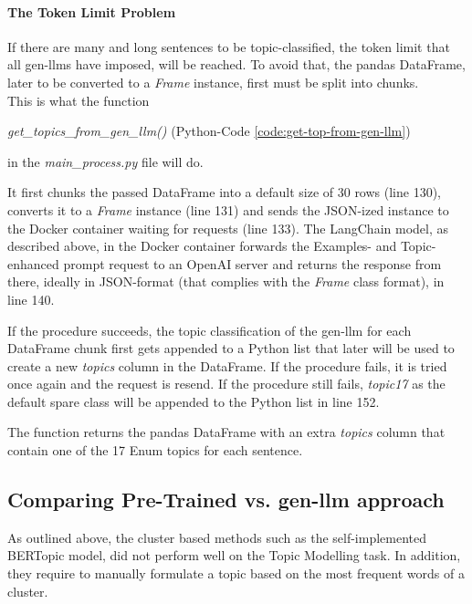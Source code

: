 \paragraph{The Token Limit Problem}
If there are many and long sentences to be topic-classified, the token limit that all \gls{gen-llm}s have imposed, will be reached.
To avoid that, the pandas DataFrame, later to be converted to a \emph{Frame} instance, first must be split into chunks.\\

This is what the function
\begin{center}
\emph{get\_topics\_from\_gen\_llm()} (Python-Code \ref{code:get-top-from-gen-llm})
\end{center}
in the \emph{main\_process.py} file will do.

It first chunks the passed DataFrame into a default size of 30 rows (line 130), converts it to a \emph{Frame} instance (line 131) and sends
the JSON-ized instance to the Docker container waiting for requests (line 133).
The LangChain model, as described above, in the Docker container forwards the Examples- and Topic-enhanced \gls{prompt} request to an OpenAI server and returns
the response from there, ideally in JSON-format (that complies with the \emph{Frame} class format), in line 140.

If the procedure succeeds, the topic classification of the \gls{gen-llm} for each DataFrame chunk first gets appended to a Python list that later will be used to create a new \emph{topics} column in the DataFrame.
If the procedure fails, it is tried once again and the request is resend.
If the procedure still fails, \emph{topic17} as the default spare class will be appended to the Python list in line 152.

The function returns the pandas DataFrame with an extra \emph{topics} column that contain one of the 17 Enum topics for each sentence.

\subsection{Comparing Pre-Trained vs. \gls{gen-llm} approach}
As outlined above, the cluster based methods such as the self-implemented BERTopic model, did not perform well on the Topic Modelling task.
In addition, they require to manually formulate a topic based on the most frequent words of a cluster.

